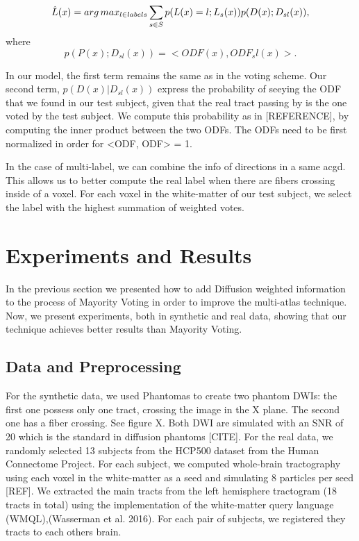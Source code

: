 \begin{equation}
\label{eq:argmax}
\hat L(x) = arg\,max_{l \in labels} \sum_{s\in S} p(L(x) = l ; L_s(x)) p(D(x) ; D_{sl}(x)),
\end{equation}
where
\begin{equation}
\label{eq:peaks}
p(P(x) ; D_{sl}(x)) = <ODF(x), ODF_sl(x)>.
\end{equation}

In our model, the first term remains the same as in the voting scheme.
Our second term, $p(D(x) | D_{sl}(x))$ express the probability
of seeying the ODF that we found in our test subject, given that the real
tract passing by is the one voted by the test subject. We compute this
probability as in [REFERENCE], by computing the inner product between the
two ODFs. The ODFs need to be first normalized in order for <ODF, ODF> = 1.

In the case of multi-label, we can combine the info of directions in a same acgd.
This allows us to better compute the real label when there are fibers crossing
inside of a voxel.
For each voxel in the white-matter of our test subject, we select the label
with the highest summation of weighted votes. 

\section{Experiments and Results}

In the previous section we presented how to add Diffusion weighted information
to the process of Mayority Voting in order to improve the multi-atlas technique.
Now, we present experiments, both in synthetic and real data, showing that
our technique achieves better results than Mayority Voting.

\subsection{Data and Preprocessing}
For the synthetic data, we used Phantomas to create two phantom DWIs: the
first one possess only one tract, crossing the image in the X plane. The 
second one has a fiber crossing. See figure X. Both DWI are simulated with
an SNR of 20 which is the standard in diffusion phantoms [CITE]. For the
real data, 
we randomly selected 13 subjects from the HCP500 dataset from the Human
Connectome Project. For each subject, we computed whole-brain tractography
using each voxel in the white-matter as a seed and simulating 8 particles per
seed [REF]. We extracted the main tracts from the left hemisphere tractogram
(18 tracts in total) using the implementation of the white-matter query
language (WMQL),(Wasserman et al. 2016). For each pair of subjects, we
registered they tracts to each others brain.

